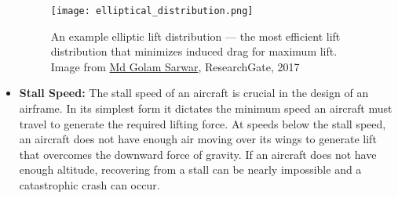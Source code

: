 \documentclass{article}
\begin{document}
\begin{itemize}
        \begin{figure}[H]
            \hspace*{\dimexpr\labelsep+\labelwidth}
            \begin{minipage}{0.915\linewidth}
                \centering
                \texttt{[image: elliptical\_distribution.png]}
                \captionsetup{width=\linewidth}
                \caption{An example elliptic lift distribution --- the most efficient lift distribution that minimizes induced drag for maximum lift. Image from 
                \href{https://www.researchgate.net/publication/358085076_LARGE_DEFLECTION_ANALYSIS_OF_AN_AIRCRAFT_WING_WITH_ELLIPTICAL_LIFT_DISTRIBUTION_AT_DIFFERENT_FLIGHT_CONDITIONS}{Md Golam Sarwar}, ResearchGate, 2017}\label{fig:elliptic_distribution}
            \end{minipage}
        \end{figure}

    \item[] \textbf{Stall Speed:} The stall speed of an aircraft is crucial in the design of an airframe. In its simplest form it dictates the minimum speed an aircraft must travel to generate the required lifting force.
    At speeds below the stall speed, an aircraft does not have enough air moving over its wings to generate lift that overcomes the downward force of gravity. If an aircraft does not have enough altitude, recovering from a stall can be nearly impossible and a catastrophic crash can occur.


\end{itemize}
\end{document}
